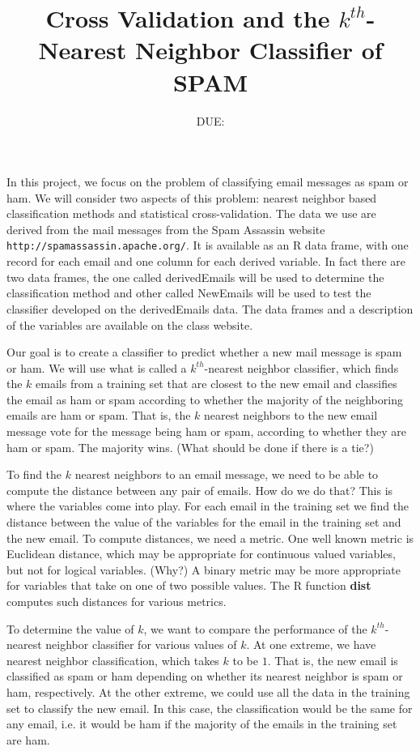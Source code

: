 \documentclass{article}
\title{Cross Validation and the $k^{th}$-Nearest Neighbor 
Classifier of SPAM}
\date{DUE: }
\def\SFunctionRef#1{\textbf{#1}}
\begin{document}
\maketitle

In this project, we focus on the problem of classifying email messages
as spam or ham.  We will consider two aspects of this problem: nearest
neighbor based classification methods and statistical cross-validation.  
The data we use are derived from the mail messages from the 
Spam Assassin website \texttt{http://spamassassin.apache.org/}.
It is available as an R data frame, with one record for each email
and one column for each derived variable. In fact there are two
data frames, the one called derivedEmails will be used to determine the classification
method and other called NewEmails will be used
to test the classifier developed on the derivedEmails data. 
The data frames and a description of the variables are available on the 
class website.

Our goal is to create a classifier to predict whether a new mail
message is spam or ham.  We will use what is called a $k^{th}$-nearest 
neighbor classifier, which finds the $k$ emails from a training
set that are closest to the new email and classifies the email as 
ham or spam according to whether the majority of the neighboring
emails are ham or spam.  That is, the $k$ nearest neighbors to the 
new email message vote for the message being ham or spam, according
to whether they are ham or spam. The majority wins. (What should
be done if there is a tie?)

To find the $k$ nearest neighbors to an email message, we need to
be able to compute the distance between any pair of emails.
How do we do that? 
This is where the variables come into play.
For each email in the training set
we find the distance between the value of the variables for the 
email in the training set and the new email.
To compute distances, we need a metric.
One well known metric is Euclidean distance, which may
be appropriate for continuous valued variables, but not
for logical variables. (Why?)
A binary metric may be more appropriate for  variables that
take on one of two possible values.  The R function
\SFunctionRef{dist} computes such distances for various metrics.

To determine the value of $k$, we want to compare the
performance of the $k^{th}$-nearest neighbor classifier for various values
of $k$.  At one extreme, we have nearest neighbor classification,
which takes $k$ to be $1$. 
That is, the new email is classified as spam or ham depending on
whether its nearest neighbor is spam or ham, respectively.
At the other extreme, we could use all the data in the training
set to classify the new email. In this case, the classification
would be the same for any email, i.e. it would be ham if the 
majority of the emails in the training set are ham.
\end{document}
